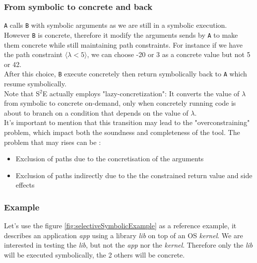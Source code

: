 \documentclass[11pt]{IEEEtran}
\begin{document}
    		\subsubsection*{From symbolic to concrete and back}
    			\texttt{A} calls \texttt{B} with symbolic arguments as we are still in a symbolic execution. However \texttt{B} is concrete, therefore it modify the arguments sends by \texttt{A} to make them concrete while still maintaining path constraints. For instance if we have the path constraint  $\langle \lambda < 5 \rangle$, we can choose -20 or 3 as a concrete value but not 5 or 42.\\
    			After this choice, \texttt{B} execute concretely then return symbolically back to \texttt{A} which resume symbolically.\\

    			Note that S$^2$E actually employs "lazy-concretization": It converts the value of $\lambda$ from symbolic to concrete on-demand, only when concretely running code is about to branch on a condition that depends on the value of $\lambda$. \\

    			It's important to mention that this transition may lead to the "overconstraining" problem, which impact both the soundness and completeness of the tool. The problem that may rises can be :
    			\begin{itemize}
    				\item Exclusion of paths due to the concretisation of the arguments
    				\item Exclusion of paths indirectly due to the the constrained return value
and side effects
    			\end{itemize}



    	\subsubsection{Example}
    	\label{subsec:S2EExample}
    		Let's use the figure \ref{fig:selectiveSymbolicExample} as a reference example, it describes an application \emph{app} using a library \emph{lib} on top of an OS \emph{kernel}. We are interested in testing the \emph{lib}, but not the \emph{app} nor the \emph{kernel}. Therefore only the \emph{lib} will be executed symbolically, the 2 others will be concrete.\\
\end{document}
